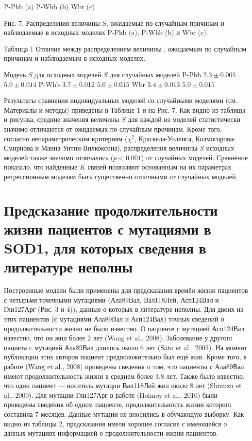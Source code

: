 P-Phb (a)
P-Whb (b)
Wbr (c)

Рис. 7. Распределения величины $S$, ожидаемые по случайным причинам и наблюдаемые в исходных моделях P-Phb (a), P-Whb (b) и Wbr (c).

Таблица 1
Отличие между распределением величины , ожидаемым по случайным причинам и наблюдаемым в исходных моделях.

Модель
$S$ для исходных моделей
$S$ для случайных моделей
P-Phb
$2.3\pm0.005$
$5.0\pm0.014$
P-Whb
$3.7\pm0.012$
$5.0\pm0.015$
Wbr
$3.4\pm0.013$
$5.0\pm0.015$

Результаты сравнения индивидуальных моделей со случайными моделями (см. Материалы и методы) приведены в Таблице 1 и на Рис. 7.  Как видно из таблицы и рисунка, средние значения величины $S$ для каждой из моделей статистически значимо отличаются от ожидаемых по случайным причинам. Кроме того, согласно непараметрическим критериям ($\chi^2$, Краскела-Уоллиса, Колмогорова-Смирнова и Манна-Уитни-Вилкоксона), распределения величины $S$ исходных моделей также значимо отличались ($p < 0.001$) от случайных моделей. Сравнение показало, что найденные $K$ связей позволяют основанным на их параметрах регрессионным моделям быть существенно отличными от случайных моделей.

\section{Предсказание продолжительности жизни пациентов с мутациями в SOD1, для которых сведения в литературе неполны} \label{sect_MD_prediction}

Построенные модели были применены для предсказания времён жизни пациентов с четырьмя точечными мутациями (Ала89Вал, Вал118Лей, Асп124Вал и Гли127Арг (Рис.  3 и 4)), данные о которых в литературе неполны. Для двоих из этих пациентов (с мутациями Ала89Вал и Асп124Вал) точных сведений о продолжительности жизни не было известно. О пациенте с мутацией Асп124Вал известно, что он жил более 2 лет (Wang et al., 2008). Заболевание у другого пациета с мутацией Ала89Вал длилось около 6 лет (Sato et al., 2005). На момент публикации этих авторов пациент предположительно был ещё жив. Кроме того, в работе (Wang et al., 2008) приведены сведения о том, что пациенты с Ала89Вал имеют продолжительность жизни в среднем более 3.8 лет. Также было известно, что один пациент — носитель мутации Вал118Лей жил около 8 лет (Shimizu et al., 2000). Для мутации Гли127Арг в работе (Holmøy et al., 2010) были приведены сведения об одном пациенте, продолжительность жизни которого составила 7 месяцев. Данные мутации не вносились в обучающую выборку. Как видно из таблицы 2, предсказания имели хорошее согласие с имеющейся о данных мутациях информацией о продолжительности жизни пациентов.

